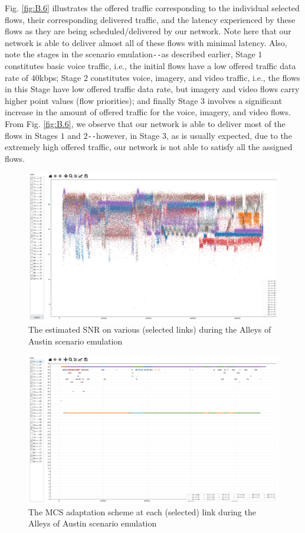 Fig. \ref{fig:B.6} illustrates the offered traffic corresponding to the individual selected flows, their corresponding delivered traffic, and the latency experienced by these flows as they are being scheduled/delivered by our network. Note here that our network is able to deliver almost all of these flows with minimal latency. Also, note the stages in the scenario emulation\texttt{-{}-}as described earlier, Stage $1$ constitutes basic voice traffic, i.e., the initial flows have a low offered traffic data rate of $40$kbps; Stage 2 constitutes voice, imagery, and video traffic, i.e., the flows in this Stage have low offered traffic data rate, but imagery and video flows carry higher point values (flow priorities); and finally Stage $3$ involves a significant increase in the amount of offered traffic for the voice, imagery, and video flows. From Fig. \ref{fig:B.6}, we observe that our network is able to deliver most of the flows in Stages $1$ and $2$\texttt{-{}-}however, in Stage $3$, as is usually expected, due to the extremely high offered traffic, our network is not able to satisfy all the assigned flows.
\begin{figure} [htb]
    \centerline{
    \includegraphics[width = 1.0\textwidth]{Alleys_SNR.PNG}}
    \caption{The estimated SNR on various (selected links) during the Alleys of Austin scenario emulation}
    \label{fig:B.7}
\end{figure}
\begin{figure} [htb]
    \centerline{
    \includegraphics[width = 1.0\textwidth]{Alleys_MCS.PNG}}
    \caption{The MCS adaptation scheme at each (selected) link during the Alleys of Austin scenario emulation}
    \label{fig:B.8}
\end{figure}

